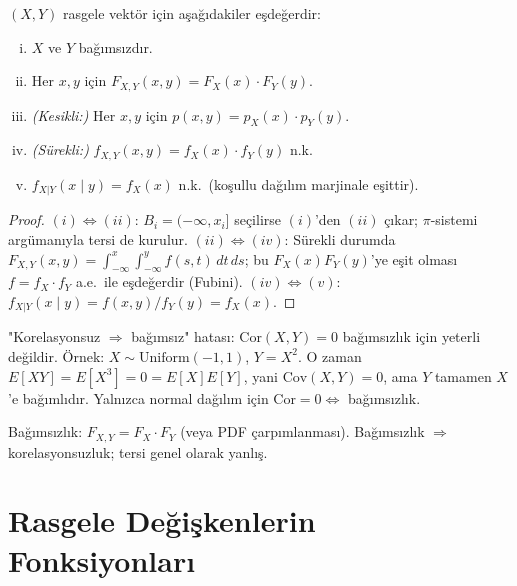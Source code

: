 \begin{teorem}
\label{thm:bagimsiz_denk}
$(X, Y)$ rasgele vektör için aşağıdakiler eşdeğerdir:
\begin{enumerate}[(i)]
  \item $X$ ve $Y$ bağımsızdır.
  \item Her $x, y$ için $F_{X,Y}(x,y) = F_X(x) \cdot F_Y(y)$.
  \item \textit{(Kesikli:)} Her $x, y$ için $p(x,y) = p_X(x) \cdot p_Y(y)$.
  \item \textit{(Sürekli:)} $f_{X,Y}(x,y) = f_X(x) \cdot f_Y(y)$ n.k.
  \item $f_{X|Y}(x \mid y) = f_X(x)$ n.k.\ (koşullu dağılım marjinale eşittir).
\end{enumerate}
\end{teorem}

\begin{proof}
$(i) \Leftrightarrow (ii)$: $B_i = (-\infty, x_i]$ seçilirse $(i)$'den $(ii)$ çıkar;
$\pi$-sistemi argümanıyla tersi de kurulur.
$(ii) \Leftrightarrow (iv)$: Sürekli durumda $F_{X,Y}(x,y) = \int_{-\infty}^x \int_{-\infty}^y f(s,t) \, dt \, ds$;
bu $F_X(x) F_Y(y)$'ye eşit olması $f = f_X \cdot f_Y$ a.e.\ ile eşdeğerdir
(Fubini).
$(iv) \Leftrightarrow (v)$: $f_{X|Y}(x \mid y) = f(x,y)/f_Y(y) = f_X(x)$.
\end{proof}

\begin{hataanalizi}
"Korelasyonsuz $\Rightarrow$ bağımsız" hatası: $\mathrm{Cor}(X, Y) = 0$
bağımsızlık için yeterli değildir.
Örnek: $X \sim \mathrm{Uniform}(-1,1)$, $Y = X^2$. O zaman $E[XY] = E[X^3] = 0 = E[X]E[Y]$,
yani $\mathrm{Cov}(X, Y) = 0$, ama $Y$ tamamen $X$'e bağımlıdır.
Yalnızca normal dağılım için $\mathrm{Cor} = 0 \Leftrightarrow$ bağımsızlık.
\end{hataanalizi}

\begin{mikroozet}
Bağımsızlık: $F_{X,Y} = F_X \cdot F_Y$ (veya PDF çarpımlanması).
Bağımsızlık $\Rightarrow$ korelasyonsuzluk; tersi genel olarak yanlış.
\end{mikroozet}

\section{Rasgele Değişkenlerin Fonksiyonları}
\label{sec:rd_donusum}

